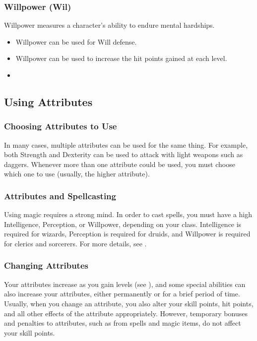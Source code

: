 \subsubsection{Willpower (Wil)}
Willpower measures a character's ability to endure mental hardships.
\begin{itemize}
    \item Willpower can be used for Will defense.
    \item Willpower can be used to increase the hit points gained at each level.
    \item 
\end{itemize}

\subsection{Using Attributes}

\subsubsection{Choosing Attributes to Use}
In many cases, multiple attributes can be used for the same thing. For example, both Strength and Dexterity can be used to attack with light weapons such as daggers. Whenever more than one attribute could be used, you must choose which one to use (usually, the higher attribute).

\subsubsection{Attributes and Spellcasting}
Using magic requires a strong mind. In order to cast spells, you must have a high Intelligence, Perception, or Willpower, depending on your class. Intelligence is required for wizards, Perception is required for druids, and Willpower is required for clerics and sorcerers. For more details, see .

\subsubsection{Changing Attributes}

Your attributes increase as you gain levels (see ), and some special abilities can also increase your attributes, either permanently or for a brief period of time. Usually, when you change an attribute, you also alter your skill points, hit points, and all other effects of the attribute appropriately. However, temporary bonuses and penalties to attributes, such as from spells and magic items, do not affect your skill points.


